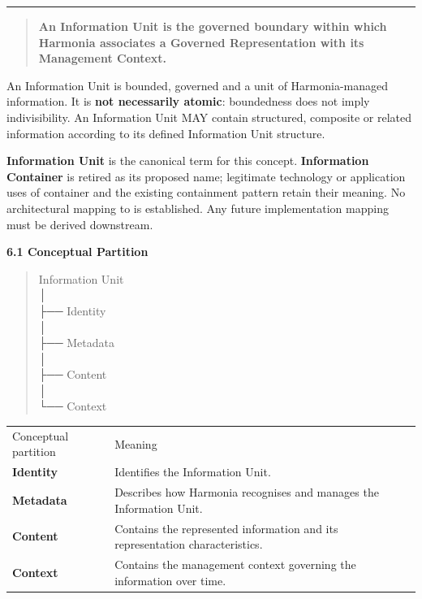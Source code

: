 \medskip\hrule\medskip


\begin{quote}


\textbf{An Information Unit is the governed boundary within which Harmonia associates a Governed Representation with its Management Context.}



\end{quote}


An Information Unit is bounded, governed and a unit of Harmonia-managed
information. It is \textbf{not necessarily atomic}: boundedness does not imply
indivisibility. An Information Unit MAY contain structured, composite or related
information according to its defined Information Unit structure.



\textbf{Information Unit} is the canonical term for this concept. \textbf{Information
Container} is retired as its proposed name; legitimate technology or application
uses of container and the existing containment pattern retain their meaning.
No architectural mapping to \texttt{} is established. Any future
implementation mapping must be derived downstream.



\par\medskip\textbf{6.1 Conceptual Partition}\par


\begin{quote}\small\ttfamily
Information Unit\\
│\\
├── Identity\\
│\\
├── Metadata\\
│\\
├── Content\\
│\\
└── Context\\

\end{quote}


\begin{longtable}{>{\raggedright\arraybackslash}p{}>{\raggedright\arraybackslash}p{}}
Conceptual partition & Meaning \\
\textbf{Identity} & Identifies the Information Unit. \\
\textbf{Metadata} & Describes how Harmonia recognises and manages the Information Unit. \\
\textbf{Content} & Contains the represented information and its representation characteristics. \\
\textbf{Context} & Contains the management context governing the information over time. \\
\end{longtable}


